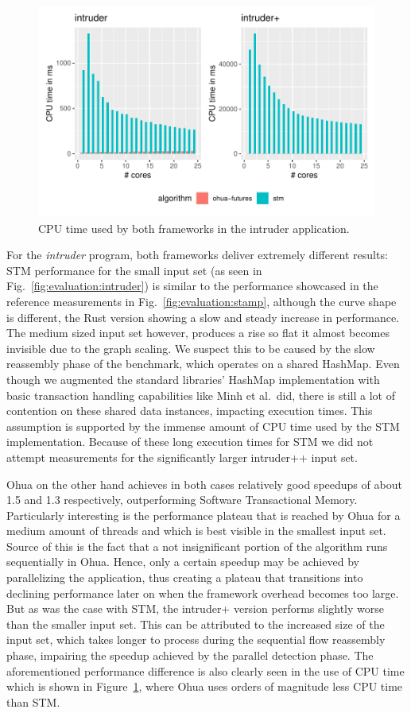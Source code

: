 \begin{figure}
    \centering
    \includegraphics[width=.66\textwidth,keepaspectratio]{gfx/results/cpu_intruder_comb}
    \caption{CPU time used by both frameworks in the intruder application.}%
    \label{fig:evaluation:intruder-cpu}
\end{figure}

For the \emph{intruder} program, both frameworks deliver extremely different results:
STM performance for the small input set (as seen in Fig.~\ref{fig:evaluation:intruder}) is similar to the performance showcased in the reference measurements in Fig.~\ref{fig:evaluation:stamp}, although the curve shape is different, the Rust version showing a slow and steady increase in performance.
The medium sized input set however, produces a rise so flat it almost becomes invisible due to the graph scaling.
We suspect this to be caused by the slow reassembly phase of the benchmark, which operates on a shared HashMap.
Even though we augmented the standard libraries' HashMap implementation with basic transaction handling capabilities like Minh et al.\ did, there is still a lot of contention on these shared data instances, impacting execution times.
This assumption is supported by the immense amount of CPU time used by the STM implementation.
Because of these long execution times for STM we did not attempt measurements for the significantly larger intruder++ input set.

Ohua on the other hand achieves in both cases relatively good speedups of about 1.5 and 1.3 respectively, outperforming Software Transactional Memory.
Particularly interesting is the performance plateau that is reached by Ohua for a medium amount of threads and which is best visible in the smallest input set.
Source of this is the fact that a not insignificant portion of the algorithm runs sequentially in Ohua.
Hence, only a certain speedup may be achieved by parallelizing the application, thus creating a plateau that transitions into declining performance later on when the framework overhead becomes too large.
But as was the case with STM, the intruder+ version performs slightly worse than the smaller input set.
This can be attributed to the increased size of the input set, which takes longer to process during the sequential flow reassembly phase, impairing the speedup achieved by the parallel detection phase.
The aforementioned performance difference is also clearly seen in the use of CPU time which is shown in Figure~\ref{fig:evaluation:intruder-cpu}, where Ohua uses orders of magnitude less CPU time than STM.


